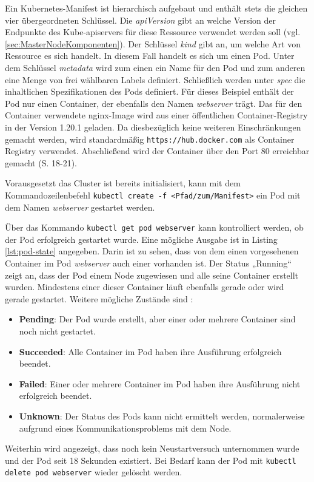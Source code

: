 \documentclass[11pt,a4paper]{article}
\begin{document}
Ein Kubernetes-Manifest ist hierarchisch aufgebaut
und enthält stets die gleichen vier übergeordneten Schlüssel.
Die \emph{apiVersion} gibt an welche Version der Endpunkte des Kube-apiservers für diese Ressource
verwendet werden soll (vgl. \ref{sec:MasterNodeKomponenten}).
Der Schlüssel \emph{kind} gibt an, um welche Art von Ressource es sich handelt.
In diesem Fall handelt es sich um einen Pod.
Unter dem Schlüssel \emph{metadata} wird zum einen ein Name für den Pod
und zum anderen eine Menge von frei wählbaren Labels definiert.
Schließlich werden unter \emph{spec} die inhaltlichen Spezifikationen des Pods
definiert. Für dieses Beispiel enthält der Pod nur einen Container, der ebenfalls den Namen
\emph{webserver} trägt. Das für den Container verwendete nginx-Image \cite{nginx} wird aus einer
öffentlichen Container-Registry in der Version 1.20.1 geladen. Da diesbezüglich keine weiteren
Einschränkungen gemacht werden, wird standardmäßig \linebreak \lstinline|https://hub.docker.com| als Container Registry
verwendet. Abschließend wird der Container über den Port 80 erreichbar gemacht \cite{Schmeling_Dargatz_2022} (S. 18-21).

Vorausgesetzt das Cluster ist bereits initialisiert, kann mit dem Kommandozeilenbefehl
\lstinline|kubectl create -f <Pfad/zum/Manifest>|
ein Pod mit dem Namen \emph{webserver} gestartet werden.

Über das Kommando \lstinline|kubectl get pod webserver| kann kontrolliert werden,
ob der Pod erfolgreich gestartet wurde. Eine mögliche Ausgabe ist in
Listing \ref{lst:pod-state} angegeben. Darin ist zu sehen, dass
von dem einen vorgesehenen Container im Pod \emph{webserver} auch einer vorhanden ist.
Der Status „Running“ zeigt an, dass der Pod einem Node zugewiesen und alle seine Container erstellt wurden.
Mindestens einer dieser Container läuft ebenfalls gerade oder wird gerade gestartet.
Weitere mögliche Zustände sind \cite{kubernetes.io_pod_lifecycle}:
\begin{itemize}
  \item \textbf{Pending}: Der Pod wurde erstellt, aber einer oder mehrere Container sind noch nicht gestartet.
  \item \textbf{Succeeded}: Alle Container im Pod haben ihre Ausführung erfolgreich beendet.
  \item \textbf{Failed}: Einer oder mehrere Container im Pod haben ihre Ausführung nicht erfolgreich beendet.
  \item \textbf{Unknown}: Der Status des Pods kann nicht ermittelt werden, normalerweise aufgrund eines Kommunikationsproblems mit dem Node.
\end{itemize}
Weiterhin wird angezeigt, dass noch kein Neustartversuch unternommen wurde
und der Pod seit 18 Sekunden existiert.
Bei Bedarf kann der Pod mit \lstinline|kubectl delete pod webserver| wieder gelöscht werden.
\end{document}
